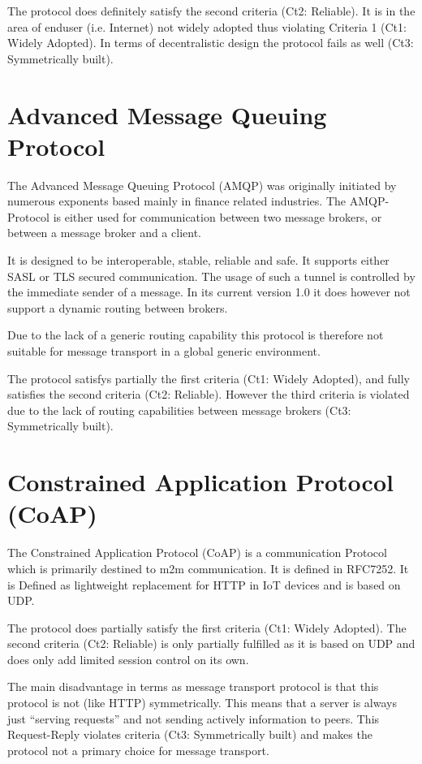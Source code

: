 The protocol does definitely satisfy the second criteria (Ct2: Reliable). It is in the area of enduser (i.e. Internet) not widely adopted thus violating Criteria 1 (Ct1: Widely Adopted). In terms of decentralistic design the protocol fails as well (Ct3: Symmetrically built).

\section{Advanced Message Queuing Protocol}
The Advanced Message Queuing Protocol (AMQP) was originally initiated by numerous exponents based mainly in finance related industries. The AMQP-Protocol is either used for communication between two message brokers, or between a message broker and a client\cite{amqp}.

It is designed to be interoperable, stable, reliable and safe. It supports either SASL or TLS secured communication. The usage of such a tunnel is controlled by the immediate sender of a message. In its current version 1.0 it does however not support a dynamic routing between brokers\cite{amqp}.

Due to the lack of a generic routing capability this protocol is therefore not suitable for message transport in a global generic environment.

The protocol satisfys partially the first criteria (Ct1: Widely Adopted), and fully satisfies the second criteria (Ct2: Reliable). However the third criteria is violated due to the lack of routing capabilities between message brokers (Ct3: Symmetrically built).

\section{Constrained Application Protocol (CoAP)}
The Constrained Application Protocol (CoAP) is a communication Protocol which is primarily destined to m2m communication. It is defined in RFC7252\cite{RFC7252}.  It is Defined as lightweight replacement for HTTP in IoT devices and is based on UDP.

The protocol does partially satisfy the first criteria (Ct1: Widely Adopted). The second criteria (Ct2: Reliable) is only partially fulfilled as it is based on UDP and does only add limited session control on its own.

The main disadvantage in terms as message transport protocol is that this protocol is not (like HTTP) symmetrically. This means that a server is always just ``serving requests'' and not sending actively information to peers. This Request-Reply violates criteria (Ct3: Symmetrically built) and makes the protocol not a primary choice for  message transport. 

